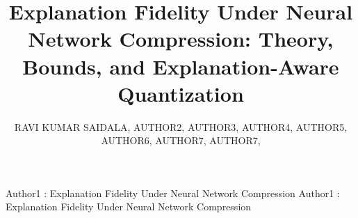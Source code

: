 \documentclass{ieeeaccess}
\begin{document}

\title{Explanation Fidelity Under Neural Network Compression: Theory, Bounds,
and Explanation-Aware Quantization}

\author{
\uppercase{Ravi Kumar Saidala},
\uppercase{Author2},
\uppercase{Author3},
\uppercase{Author4},
\uppercase{Author5},
\uppercase{Author6},
\uppercase{Author7},
\uppercase{Author7}, 
}

\address[1]{Department of Computer Science and Engineering(Data Science), CMR University, Bengaluru, India (e-mail: ravikumar.s@cmr.edu.in)}
\address[2]{Department of xxx, xxx College, xxx, xxx, India (e-mail: author2@xxx.edu)}
\address[3]{Department of xxx, xxx College, xxx, xxx, India (e-mail: author3@xxx.edu)}
\address[4]{Department of xxx, xxx College, xxx, xxx, India (e-mail: author4@xxx.edu)}
\address[5]{Department of xxx, xxx College, xxx, xxx, India (e-mail: author5@xxx.edu)}
\address[6]{Department of xxx, xxx College, xxx, xxx, India (e-mail: author6@xxx.edu)}
\address[7]{Department of xxx, xxx College, xxx, xxx, India (e-mail: author7@xxx.edu)}
\address[8]{Department of xxx, xxx College, xxx, xxx, India (e-mail: author8@xxx.edu)}

\markboth
{Author1 \headeretal: Explanation Fidelity Under Neural Network Compression}
{Author1 \headeretal: Explanation Fidelity Under Neural Network Compression}

\end{document}
